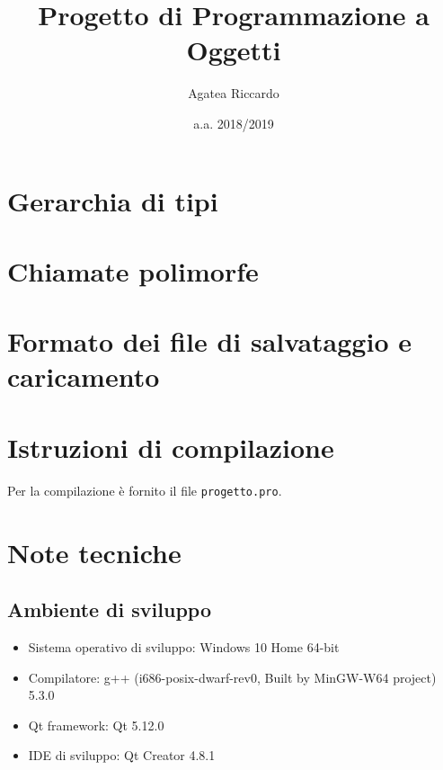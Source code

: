 \documentclass{article}
\title{Progetto di Programmazione a Oggetti}
\author{Agatea Riccardo}
\date{a.a. 2018/2019}
\begin{document}
\maketitle
\newpage
{}
\section{Gerarchia di tipi} %
\label{sec:gerarchia_di_tipi}

\section{Chiamate polimorfe} %
\label{sec:chiamate_polimorfe}

\section{Formato dei file di salvataggio e caricamento} %
\label{sec:formato_dei_file_di_salvataggio_e_caricamento}

\section{Istruzioni di compilazione} %
\label{sec:istruzioni_di_compilazione}
Per la compilazione è fornito il file \verb|progetto.pro|.
\section{Note tecniche} %
\label{sec:note_tecniche}
\subsection{Ambiente di sviluppo} %
\label{sub:ambiente_di_sviluppo}
\begin{itemize}
	\item Sistema operativo di sviluppo: Windows 10 Home 64-bit
	\item Compilatore: g++ (i686-posix-dwarf-rev0, Built by MinGW-W64 project) 5.3.0
	\item Qt framework: Qt 5.12.0
	\item IDE di sviluppo: Qt Creator 4.8.1
\end{itemize}
\end{document}
